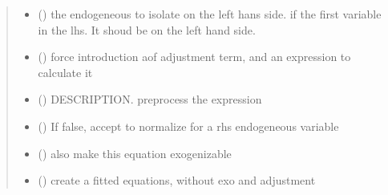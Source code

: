\documentclass[letterpaper,10pt,english]{sphinxmanual}
\begin{document}
\begin{fulllineitems}
\begin{quote}
\begin{description}
\begin{itemize}
\item {} 
\sphinxAtStartPar
{} (\sphinxstyleliteralemphasis{\sphinxupquote{, }}) \textendash{} the endogeneous to isolate on the left hans side. if the first variable in the lhs.
It shoud be on the left hand side.

\item {} 
\sphinxAtStartPar
{} (\sphinxstyleliteralemphasis{\sphinxupquote{, }}) \textendash{} force introduction aof adjustment term, and an expression to calculate it

\item {} 
\sphinxAtStartPar
{} (\sphinxstyleliteralemphasis{\sphinxupquote{, }}) \textendash{} DESCRIPTION. preprocess the expression

\item {} 
\sphinxAtStartPar
{} (\sphinxstyleliteralemphasis{\sphinxupquote{, }}) \textendash{} If false, accept to normalize for a rhs endogeneous variable

\item {} 
\sphinxAtStartPar
{} (\sphinxstyleliteralemphasis{\sphinxupquote{, }}) \textendash{} also make this equation exogenizable

\item {} 
\sphinxAtStartPar
{} (\sphinxstyleliteralemphasis{\sphinxupquote{,}}) \textendash{} create a fitted equations, without exo and adjustment

\end{itemize}

\end{description}\end{quote}


\end{fulllineitems}
\end{document}
